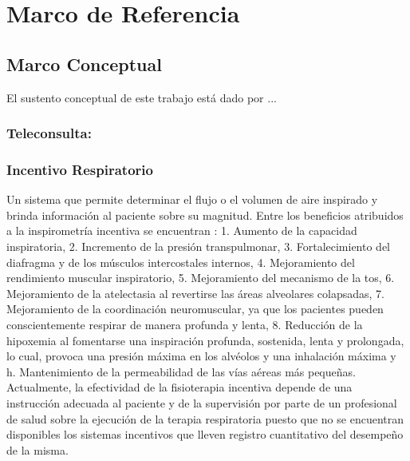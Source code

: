\documentclass[12pt]{article}
\begin{document}
\section{Marco de Referencia}

\subsection{Marco Conceptual}

El sustento conceptual de este trabajo está dado por ...


\subsubsection{Teleconsulta:}


\subsubsection{Incentivo Respiratorio}
 
Un sistema que permite determinar el flujo o el volumen de aire inspirado y brinda informaci\'on al paciente sobre su magnitud.  Entre los beneficios atribuidos a la inspirometr\'ia incentiva se encuentran \cite{23}: 1. Aumento de la capacidad inspiratoria, 2. Incremento de la presi\'on transpulmonar, 3. Fortalecimiento del diafragma y de los m\'usculos intercostales internos, 4. Mejoramiento del rendimiento muscular inspiratorio, 5. Mejoramiento del mecanismo de la tos,  6. Mejoramiento de la atelectasia al revertirse las \'areas alveolares colapsadas, 7. Mejoramiento de la coordinaci\'on neuromuscular, ya que los pacientes pueden conscientemente respirar de manera profunda y lenta, 8. Reducci\'on de la hipoxemia al fomentarse una inspiraci\'on profunda, sostenida, lenta y prolongada, lo cual, provoca una presi\'on m\'axima en los alv\'eolos y una inhalaci\'on m\'axima y h.  Mantenimiento de la permeabilidad de las v\'ias a\'ereas m\'as peque\~{n}as. Actualmente, la efectividad de la fisioterapia incentiva depende de una instrucci\'on adecuada al paciente y de la supervisi\'on por parte de un profesional de salud sobre la ejecuci\'on de la terapia respiratoria \cite{24} puesto que no se encuentran disponibles los sistemas incentivos que lleven registro cuantitativo del desempe\~{n}o de la misma.
\end{document}
